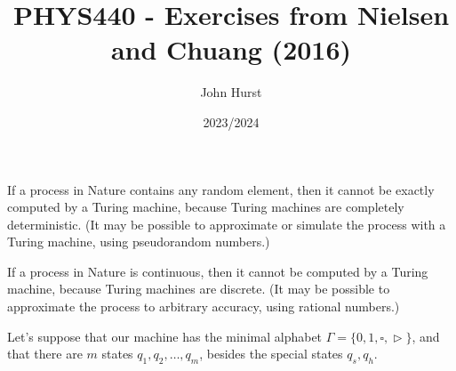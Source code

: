 \documentclass[12pt]{extarticle}
\title{PHYS440 - Exercises from Nielsen and Chuang (2016)}
\author{John Hurst}
\date{2023/2024}
\begin{document}
\maketitle



If a process in Nature contains any random element, then it cannot be exactly computed by a Turing machine, because Turing machines are completely deterministic.
(It may be possible to approximate or simulate the process with a Turing machine, using pseudorandom numbers.)

If a process in Nature is continuous, then it cannot be computed by a Turing machine, because Turing machines are discrete.
(It may be possible to approximate the process to arbitrary accuracy, using rational numbers.)


Let's suppose that our machine has the minimal alphabet $\Gamma = \{0, 1, \square, \vartriangleright\}$,
and that there are $m$ states $q_1, q_2, \ldots, q_m$, besides the special states $q_s, q_h$.
\end{document}
